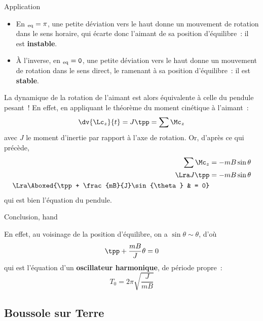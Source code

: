 \documentclass[../main/main.tex]{subfiles}
\begin{document}
\begin{rexem}{Application}
{\begin{enumerate}
			      \begin{itemize}
				      \item En $\tt_{\rm eq} = \pi$, une petite déviation vers le haut
				            donne un mouvement de rotation dans le sens horaire, qui écarte
				            donc l'aimant de sa position d'équilibre~: il est
				            \textbf{instable}.
				      \item À l'inverse, en $\tt_{\rm eq} = 0$, une petite
				            déviation vers le haut donne un mouvement de rotation dans
				            le sens direct, le ramenant à sa position d'équilibre~: il
				            est \textbf{stable}.
			      \end{itemize}
		\end{enumerate}
	}
\end{rexem}

La dynamique de la rotation de l'aimant est alors équivalente à celle du pendule
pesant~! En effet, en appliquant le théorème du moment cinétique à l'aimant~:
\[
	\dv{\Lc_z}{t} = J\tpp = \sum \Mc_z
\]
avec $J$ le moment d'inertie par rapport à l'axe de rotation. Or,
d'après ce qui précède,
\begin{align*}
	\sum \Mc_z                              & = -mB\sin{\theta}
	\\\Lra
	J\tpp                                   & = -mB\sin{\theta}
	\\\Lra
	\Aboxed{\tpp + \frac{mB}{J}\sin{\theta} & = 0}
\end{align*}
qui est bien l'équation du pendule.
\begin{tror}{Conclusion, hand}
\end{tror}
En effet, au voisinage de
la position d'équilibre, on a $\sin{\theta} \sim \theta$, d'où
\[
	\tpp + \frac{mB}{J}\theta = 0
\]
qui est l'équation d'un \textbf{oscillateur harmonique}, de période propre~:
\[
	T_0 = 2\pi \sqrt{\frac{J}{mB}}
\]

\subsection{Boussole sur Terre}
\label{ssec:boussoleterre}
\end{document}
